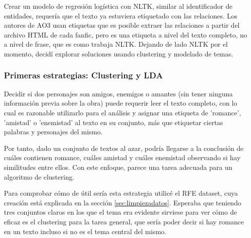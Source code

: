 \documentclass{pre-tfg}
\begin{document}
Crear un modelo de regresión logística con NLTK, similar al identificador de entidades, requería que el texto ya estuviera etiquetado con las relaciones. Los autores de AO3 usan etiquetas que es posible extraer las relaciones a partir del archivo HTML de cada fanfic, pero es una etiqueta a nivel del texto completo, no a nivel de frase, que es como trabaja NLTK. Dejando de lado NLTK por el momento, decidí explorar soluciones usando clustering y modelado de temas.

\subsubsection{Primeras estrategias: Clustering y LDA}
\label{sec:relextract}
Decidir si dos personajes son amigos, enemigos o amantes (sin tener ninguna información previa sobre la obra) puede requerir leer el texto completo, con lo cual es razonable utilizarlo para el análisis y asignar una etiqueta de 'romance', 'amistad' o 'enemistad' al texto en su conjunto, más que etiquetar ciertas palabras y personajes del mismo.

Por tanto, dado un conjunto de textos al azar, podría llegarse a la conclusión de cuáles contienen romance, cuáles amistad y cuáles enemistad observando si hay similitudes entre ellos. Con este enfoque, parece una tarea adecuada para un algoritmo de clustering.

Para comprobar cómo de útil sería esta estrategia utilicé el RFE dataset, cuya creación está explicada en la sección \ref{sec:limpiezadatos}. Esperaba que teniendo tres conjuntos claros en los que el tema era evidente sirviese para ver cómo de eficaz es el clustering para la tarea general, que sería poder decir si hay romance en un texto incluso si no es el tema central del mismo.
\end{document}
